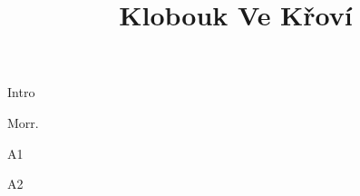 \documentclass[timestamp]{jazzgrid}
\title{\textbf{Klobouk Ve Křoví}}
\begin{document}
\maketitle
\begin{musicsection}{Intro}
\barline
	{\barfour{}
		{}
		{}
		{}
		{}
	}
	{\barfour{}
		{}
		{}
		{}
		{}
	}
	{\barfour{}
		{}
		{}
		{}
		{}
	}
	{\barfour{}
		{}
		{}
		{}
		{}
	}
\barline
	{\barfour{}
		{}
		{}
		{}
		{}
	}
	{\barfour{}
		{}
		{}
		{}
		{}
	}
	{\barfour{}
		{}
		{}
		{}
		{}
	}
	{\barfour{}
		{}
		{}
		{}
		{}
	}
\end{musicsection}

\begin{musicsection}{Morr.}
\barline
	{\barfour{}
		{}
		{}
		{}
		{}
	}
	{\barfour{}
		{}
		{}
		{}
		{}
	}
	{\barfour{}
		{}
		{}
		{}
		{}
	}
	{\barfour{}
		{}
		{}
		{}
		{}
	}
\barline
	{\barfour{}
		{}
		{}
		{}
		{}
	}
	{\barfour{}
		{}
		{}
		{}
		{}
	}
	{\barfour{}
		{}
		{}
		{}
		{}
	}
	{\barfour{}
		{}
		{}
		{}
		{}
	}
	{\barfour{}
		{}
		{}
		{}
		{}
	}
	{\barfour{}
		{}
		{}
		{}
		{}
	}
	{\barfour{}
		{}
		{}
		{}
		{}
	}
\end{musicsection}

\begin{musicsection}{A1}
\barline
	{\barfour{}
		{}
		{}
		{}
		{}
	}
	{\barfour{}
		{}
		{}
		{}
		{}
	}
	{\barfour{}
		{}
		{}
		{}
		{}
	}
	{\barfour{}
		{}
		{}
		{}
		{}
	}
\barline
	{\barfour{}
		{}
		{}
		{}
		{}
	}
	{\barfour{}
		{}
		{}
		{}
		{}
	}
	{\barfour{}
		{}
		{}
		{}
		{}
	}
	{\barfour{}
		{}
		{}
		{}
		{}
	}
\end{musicsection}

\begin{musicsection}{A2}
\barline
	{\barfour{}
		{}
		{}
		{}
		{}
	}
	{\barfour{}
		{}
		{}
		{}
		{}
	}
	{\barfour{}
		{}
		{}
		{}
		{}
	}
	{\barfour{}
		{}
		{}
		{}
		{}
	}
\barline
	{\barfour{}
		{}
		{}
		{}
		{}
	}
	{\barfour{}
		{}
		{}
		{}
		{}
	}
	{\barfour{}
		{}
		{}
		{}
		{}
	}
	{\barfour{}
		{}
		{}
		{}
		{}
	}
\end{musicsection}
\end{document}
